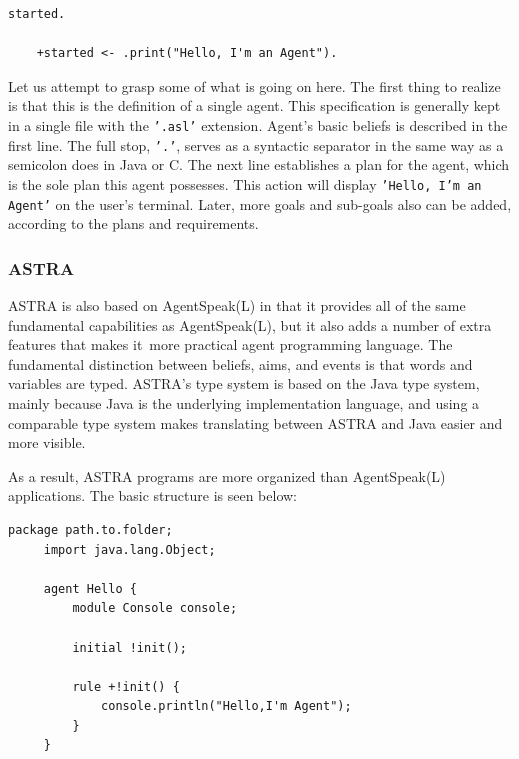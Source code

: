 \vspace{.5cm}

\begin{lstlisting}[backgroundcolor = \color{white}, frame=none, numbers=none]
    started.

    +started <- .print("Hello, I'm an Agent").
\end{lstlisting}

\vspace{.5cm}

Let us attempt to grasp some of what is going on here. The first thing to realize is that this is the definition of a single agent. This specification is generally kept in a single file with the \texttt{'.asl'} extension. Agent's basic beliefs is described in the first line. The full stop, \texttt{'.'}, serves as a syntactic separator in the same way as a semicolon does in Java or C. The next line establishes a plan for the agent, which is the sole plan this agent possesses. This action will display \texttt{'Hello, I'm an Agent'} on the user's terminal. Later, more goals and sub-goals also can be added, according to the plans and requirements.

\subsubsection{ASTRA}

ASTRA is also based on AgentSpeak(L) in that it provides all of the same fundamental capabilities as AgentSpeak(L), but it also adds a number of extra features that makes it more practical agent programming language. The fundamental distinction between beliefs, aims, and events is that words and variables are typed. ASTRA's type system is based on the Java type system, mainly because Java is the underlying implementation language, and using a comparable type system makes translating between ASTRA and Java easier and more visible.

\vspace{.5cm}
As a result, ASTRA programs are more organized than AgentSpeak(L) applications. The basic structure is seen below:

\vspace{.5cm}

\begin{lstlisting}[backgroundcolor = \color{white}, frame=none, numbers=none]
     package path.to.folder;
     import java.lang.Object;
     
     agent Hello {
         module Console console;
    
         initial !init();
    
         rule +!init() {
             console.println("Hello,I'm Agent");
         }
     }
\end{lstlisting}

